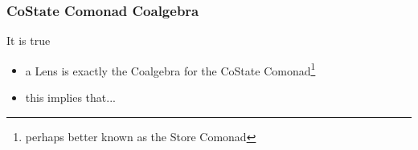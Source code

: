 \begin{frame}
\frametitle{CoState Comonad Coalgebra}

\begin{block}{It is true}
  \begin{itemize}
  \item a Lens is exactly the Coalgebra for the CoState Comonad\footnote{perhaps better known as the Store Comonad}
  \item this implies that...
  \end{itemize}
\end{block}
\end{frame}

